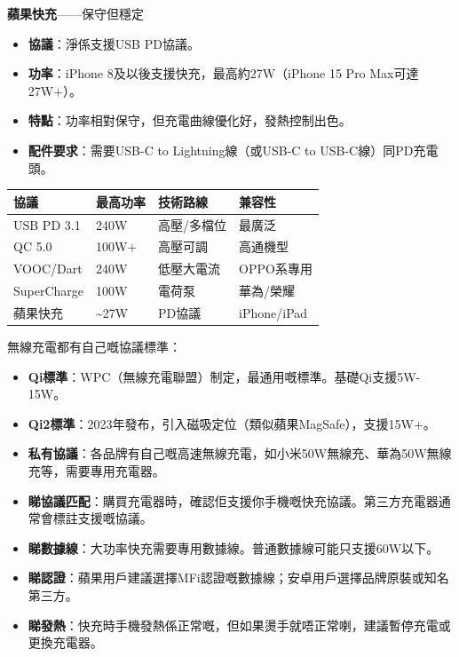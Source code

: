 \textbf{蘋果快充}——保守但穩定

\begin{itemize}
  \item \textbf{協議}：淨係支援USB PD協議。
  \item \textbf{功率}：iPhone 8及以後支援快充，最高約27W（iPhone 15 Pro Max可達27W+）。
  \item \textbf{特點}：功率相對保守，但充電曲線優化好，發熱控制出色。
  \item \textbf{配件要求}：需要USB-C to Lightning線（或USB-C to USB-C線）同PD充電頭。
\end{itemize}


\begin{center}
\begin{tabularx}{\linewidth}{|X|X|X|X|}
\hline
\textbf{協議} & \textbf{最高功率} & \textbf{技術路線} & \textbf{兼容性} \tabularnewline
\hline
USB PD 3.1 & 240W & 高壓/多檔位 & 最廣泛 \tabularnewline
QC 5.0 & 100W+ & 高壓可調 & 高通機型 \tabularnewline
VOOC/Dart & 240W & 低壓大電流 & OPPO系專用 \tabularnewline
SuperCharge & 100W & 電荷泵 & 華為/榮耀 \tabularnewline
蘋果快充 & \textasciitilde{}27W & PD協議 & iPhone/iPad \tabularnewline
\hline
\end{tabularx}
\end{center}


無線充電都有自己嘅協議標準：

\begin{itemize}
  \item \textbf{Qi標準}：WPC（無線充電聯盟）制定，最通用嘅標準。基礎Qi支援5W-15W。
  \item \textbf{Qi2標準}：2023年發布，引入磁吸定位（類似蘋果MagSafe），支援15W+。
  \item \textbf{私有協議}：各品牌有自己嘅高速無線充電，如小米50W無線充、華為50W無線充等，需要專用充電器。
\end{itemize}


\begin{itemize}
  \item \textbf{睇協議匹配}：購買充電器時，確認佢支援你手機嘅快充協議。第三方充電器通常會標註支援嘅協議。
  \item \textbf{睇數據線}：大功率快充需要專用數據線。普通數據線可能只支援60W以下。
  \item \textbf{睇認證}：蘋果用戶建議選擇MFi認證嘅數據線；安卓用戶選擇品牌原裝或知名第三方。
  \item \textbf{睇發熱}：快充時手機發熱係正常嘅，但如果燙手就唔正常喇，建議暫停充電或更換充電器。
\end{itemize}

